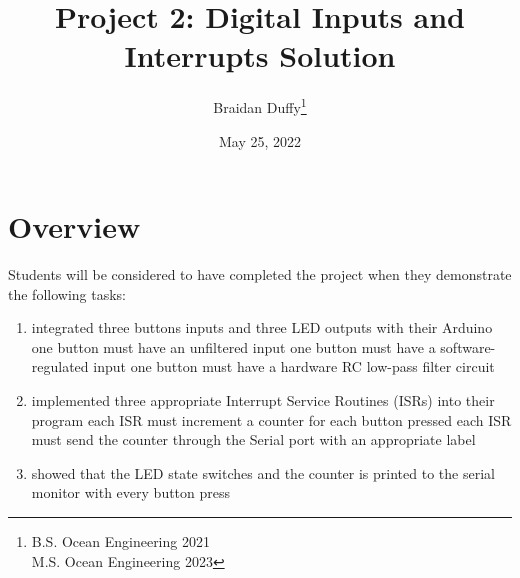 \documentclass{article}
\title{Project 2: Digital Inputs and Interrupts Solution}
\author{Braidan Duffy\thanks{B.S. Ocean Engineering 2021\\M.S. Ocean Engineering 2023}}
\date{May 25, 2022}
\begin{document}
\maketitle

\section*{Overview}
Students will be considered to have completed the project when they demonstrate the following tasks:

\begin{enumerate}
    \item integrated three buttons inputs and three LED outputs with their Arduino
        \subitem one button must have an unfiltered input
        \subitem one button must have a software-regulated input
        \subitem one button must have a hardware RC low-pass filter circuit
    \item implemented three appropriate Interrupt Service Routines (ISRs) into their program
        \subitem each ISR must increment a counter for each button pressed
        \subitem each ISR must send the counter through the Serial port with an appropriate label
    \item showed that the LED state switches and the counter is printed to the serial monitor with every button press   
\end{enumerate}
\end{document}
